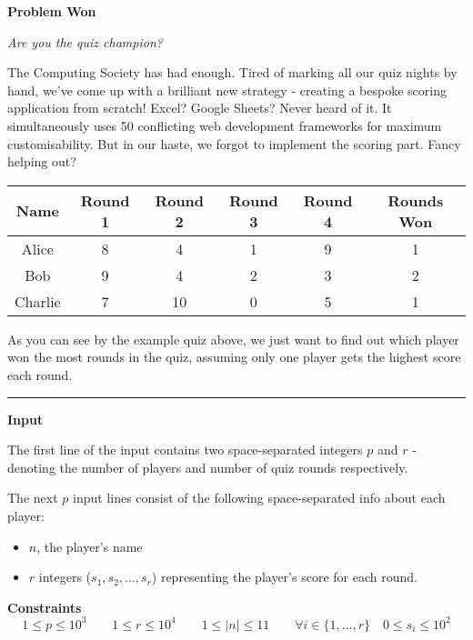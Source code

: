 \LARGE {} \textbf{Problem Won} \normalsize

{\itshape Are you the quiz champion?}

The Computing Society has had enough. 
Tired of marking all our quiz nights by hand, we've come up with a brilliant new strategy - creating a bespoke scoring application from scratch! 
Excel? 
Google Sheets? 
Never heard of it.
It simultaneously uses 50 conflicting web development frameworks for maximum customisability. 
But in our haste, we forgot to implement the scoring part.
Fancy helping out?

\begin{table}[h]
    \centering
    \begin{tabular}{|c|c|c|c|c|c|}
        \hline
        \textbf{Name} & Round 1 & Round 2 & Round 3 & Round 4 & \textbf{Rounds Won} \\
        \hline
        Alice & 8 & 4 & 1 & \cellcolor{cyan}9 & 1\\
        Bob & \cellcolor{cyan}9 & 4 & \cellcolor{cyan}2 & 3 & \cellcolor{yellow}2 \\
        Charlie & 7 & \cellcolor{cyan}10 & 0 & 5 & 1 \\
        \hline
    \end{tabular}
\end{table}

As you can see by the example quiz above, we just want to find out which player won the most rounds in the quiz, 
assuming only one player gets the highest score each round.

\vspace{8pt}
\hrule

\textbf{Input}

The first line of the input contains two space-separated integers $p$ and $r$ 
- denoting the number of players and number of quiz rounds respectively.

The next $p$ input lines consist of the following space-separated info about each player:
\begin{itemize}
    \item $n$, the player's name
    \item $r$ integers ($s_1, s_2, \dots, s_r$) representing the player's score for each round.
\end{itemize}

\textbf{Constraints}
\begin{equation*}
    1 \leq p \leq 10^3 \qquad 
    1 \leq r \leq 10^4 \qquad 
    1 \leq |n| \leq 11 \qquad 
    \forall i \in \{1, \dots, r\} \quad 0 \leq s_i \leq 10^2
\end{equation*}

